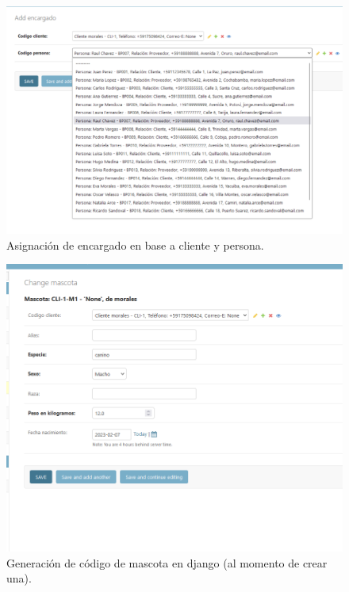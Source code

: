 \documentclass[
  12pt,
  hidelinks,
  a4paper,
  headings=standardclasses,
  headings=big,
  spanish
]{scrartcl}
\begin{document}
\begin{figure}[H]
  \centering
  \caption{Asignación de encargado en base a cliente y persona.}
  \includegraphics[width=\textwidth]{django-encargado-assign.png}
\end{figure}

\begin{figure}[H]
  \centering
  \includegraphics[width=\textwidth]{django-mascota-create.png}
  \caption{Generación de código de mascota en django (al momento de crear una).}
\end{figure}
\end{document}
